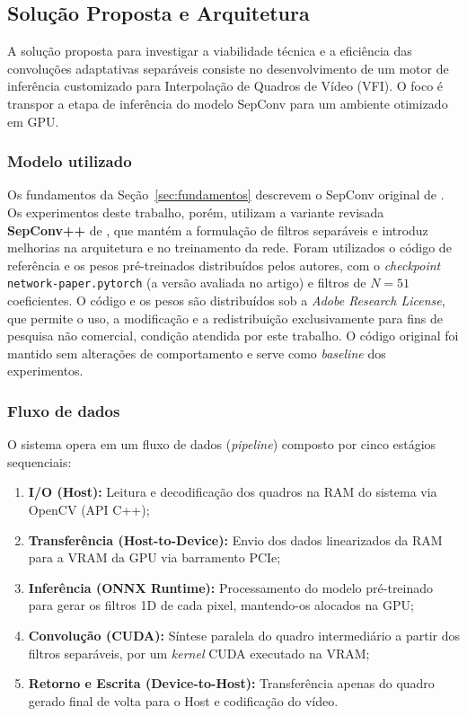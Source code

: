 \documentclass[
    12pt,                %
    openright,           %
    oneside,             %
    a4paper,             %
    english,             %
    brazil               %
]{abntex2}
\begin{document}
\subsection{Solução Proposta e Arquitetura}
\label{sec:solucao}

A solução proposta para investigar a viabilidade técnica e a eficiência das convoluções adaptativas separáveis consiste no desenvolvimento de um motor de inferência customizado para Interpolação de Quadros de Vídeo (VFI). O foco é transpor a etapa de inferência do modelo SepConv para um ambiente otimizado em GPU.

\subsubsection{Modelo utilizado}
\label{sec:modelo_utilizado}

Os fundamentos da Seção~\ref{sec:fundamentos} descrevem o SepConv original de . Os experimentos deste trabalho, porém, utilizam a variante revisada \textbf{SepConv++} de , que mantém a formulação de filtros separáveis e introduz melhorias na arquitetura e no treinamento da rede. Foram utilizados o código de referência e os pesos pré-treinados distribuídos pelos autores, com o \textit{checkpoint} \texttt{network-paper.pytorch} (a versão avaliada no artigo) e filtros de $N = 51$ coeficientes. O código e os pesos são distribuídos sob a \textit{Adobe Research License}, que permite o uso, a modificação e a redistribuição exclusivamente para fins de pesquisa não comercial, condição atendida por este trabalho. O código original foi mantido sem alterações de comportamento e serve como \textit{baseline} dos experimentos.

\subsubsection{Fluxo de dados}

O sistema opera em um fluxo de dados (\textit{pipeline}) composto por cinco estágios sequenciais:

\begin{enumerate}
    \item \textbf{I/O (Host):} Leitura e decodificação dos quadros na RAM do sistema via OpenCV (API C++);
    \item \textbf{Transferência (Host-to-Device):} Envio dos dados linearizados da RAM para a VRAM da GPU via barramento PCIe;
    \item \textbf{Inferência (ONNX Runtime):} Processamento do modelo pré-treinado para gerar os filtros 1D de cada pixel, mantendo-os alocados na GPU;
    \item \textbf{Convolução (CUDA):} Síntese paralela do quadro intermediário a partir dos filtros separáveis, por um \textit{kernel} CUDA executado na VRAM;
    \item \textbf{Retorno e Escrita (Device-to-Host):} Transferência apenas do quadro gerado final de volta para o Host e codificação do vídeo.
\end{enumerate}
\end{document}
